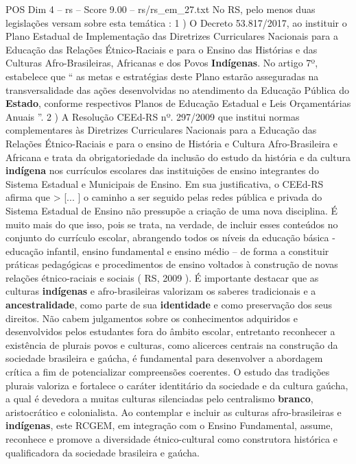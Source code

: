 \begin{textsample}{POS Dim 4 – rs – Score 9.00 – rs/rs\_em\_27.txt}
No RS, pelo menos duas legislações versam sobre esta temática : 1 ) O Decreto 53.817/2017, ao instituir o Plano Estadual de Implementação das Diretrizes Curriculares Nacionais para a Educação das Relações Étnico-Raciais e para o Ensino das Histórias e das Culturas Afro-Brasileiras, Africanas e dos Povos \textbf{Indígenas}.
No artigo 7º, estabelece que “ as metas e estratégias deste Plano estarão asseguradas na transversalidade das ações desenvolvidas no atendimento da Educação Pública do \textbf{Estado}, conforme respectivos Planos de Educação Estadual e Leis Orçamentárias Anuais ”. 2 ) A Resolução CEEd-RS nº. 297/2009 que institui normas complementares às Diretrizes Curriculares Nacionais para a Educação das Relações Étnico-Raciais e para o ensino de História e Cultura Afro-Brasileira e Africana e trata da obrigatoriedade da inclusão do estudo da história e da cultura \textbf{indígena} nos currículos escolares das instituições de ensino integrantes do Sistema Estadual e Municipais de Ensino.
Em sua justificativa, o CEEd-RS afirma que > [... ] o caminho a ser seguido pelas redes pública e privada do Sistema Estadual de Ensino não pressupõe a criação de uma nova disciplina.
É muito mais do que isso, pois se trata, na verdade, de incluir esses conteúdos no conjunto do currículo escolar, abrangendo todos os níveis da educação básica - educação infantil, ensino fundamental e ensino médio – de forma a constituir práticas pedagógicas e procedimentos de ensino voltados à construção de novas relações étnico-raciais e sociais ( RS, 2009 ).
É importante destacar que as culturas \textbf{indígenas} e afro-brasileiras valorizam os saberes tradicionais e a \textbf{ancestralidade}, como parte de sua \textbf{identidade} e como preservação dos seus direitos.
Não cabem julgamentos sobre os conhecimentos adquiridos e desenvolvidos pelos estudantes fora do âmbito escolar, entretanto reconhecer a existência de plurais povos e culturas, como alicerces centrais na construção da sociedade brasileira e gaúcha, é fundamental para desenvolver a abordagem crítica a fim de potencializar compreensões coerentes.
O estudo das tradições plurais valoriza e fortalece o caráter identitário da sociedade e da cultura gaúcha, a qual é devedora a muitas culturas silenciadas pelo centralismo \textbf{branco}, aristocrático e colonialista.
Ao contemplar e incluir as culturas afro-brasileiras e \textbf{indígenas}, este RCGEM, em integração com o Ensino Fundamental, assume, reconhece e promove a diversidade étnico-cultural como construtora histórica e qualificadora da sociedade brasileira e gaúcha.

\end{textsample}
